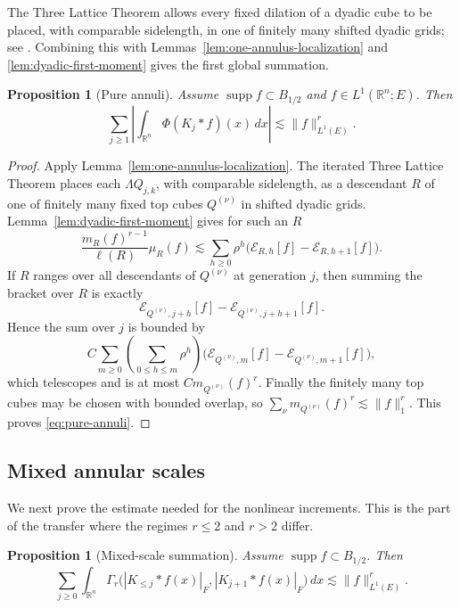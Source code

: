 \documentclass[10pt,a4paper]{amsart}
\numberwithin{equation}{section}
\newtheorem{proposition}[theorem]{Proposition}
\newcommand{\R}{\mathbb R}
\newcommand{\supp}{\operatorname{supp}}
\newcommand{\norm}[1]{\lVert #1\rVert}
\begin{document}
The Three Lattice Theorem allows every fixed dilation of a dyadic cube to be
placed, with comparable sidelength, in one of finitely many shifted dyadic
grids; see \cite[Section~3]{LernerNazarov19}.  Combining this with
Lemmas~\ref{lem:one-annulus-localization} and
\ref{lem:dyadic-first-moment} gives the first global summation.

\begin{proposition}[Pure annuli]\label{prop:pure-annuli}
Assume $\supp f\subset B_{1/2}$ and $f\in L^1(\R^n;E)$.  Then
\begin{equation}\label{eq:pure-annuli}
 \sum_{j\ge1}
 \left|\int_{\R^n}\Phi(K_j*f)(x)\,dx\right|
 \lesssim \norm f_{L^1(E)}^r.
\end{equation}
\end{proposition}

\begin{proof}
Apply Lemma~\ref{lem:one-annulus-localization}.  The iterated Three Lattice
Theorem places each $\Lambda Q_{j,k}$, with comparable sidelength, as a
descendant $R$ of one of finitely many fixed top cubes $Q^{(\nu)}$ in shifted
dyadic grids.  Lemma~\ref{lem:dyadic-first-moment} gives for such an $R$
\[
 \frac{m_R(f)^{r-1}}{\ell(R)}\mu_R(f)
 \lesssim\sum_{h\ge0}\rho^h
 \bigl(\mathcal E_{R,h}[f]-\mathcal E_{R,h+1}[f]\bigr).
\]
If $R$ ranges over all descendants of $Q^{(\nu)}$ at generation $j$, then
summing the bracket over $R$ is exactly
\[
 \mathcal E_{Q^{(\nu)},j+h}[f]
 -\mathcal E_{Q^{(\nu)},j+h+1}[f].
\]
Hence the sum over $j$ is bounded by
\[
 C\sum_{m\ge0}
 \left(\sum_{0\le h\le m}\rho^h\right)
 \bigl(\mathcal E_{Q^{(\nu)},m}[f]
       -\mathcal E_{Q^{(\nu)},m+1}[f]\bigr),
\]
which telescopes and is at most $C m_{Q^{(\nu)}}(f)^r$.  Finally the finitely
many top cubes may be chosen with bounded overlap, so
$\sum_\nu m_{Q^{(\nu)}}(f)^r\lesssim\norm f_1^r$.  This proves
\eqref{eq:pure-annuli}.
\end{proof}

\subsection{Mixed annular scales}
We next prove the estimate needed for the nonlinear increments.  This is the
part of the transfer where the regimes $r\le2$ and $r>2$ differ.

\begin{proposition}[Mixed-scale summation]\label{prop:mixed-scales}
Assume $\supp f\subset B_{1/2}$.  Then
\begin{equation}\label{eq:mixed-scales}
 \sum_{j\ge0}\int_{\R^n}
 \Gamma_r\bigl(|K_{\le j}*f(x)|_F,|K_{j+1}*f(x)|_F\bigr)\,dx
 \lesssim \norm f_{L^1(E)}^r.
\end{equation}
\end{proposition}
\end{document}
